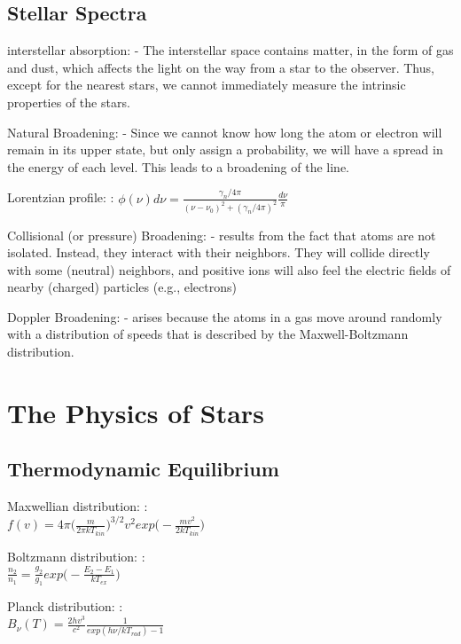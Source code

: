 \documentclass[a4paper, 11pt, landscape]{article}
\begin{document}
\begin{multicols*}{3}
\subsection{Stellar Spectra}
\begin{compactenum}
    \item [\color{red}interstellar absorption:]  - The interstellar space contains matter, in the form of gas and dust, which affects the light on the way from a star to the observer. Thus, except for the nearest stars, we cannot immediately measure the intrinsic properties of the stars.
	\item [\color{red}Natural Broadening:] - Since we cannot know how long the atom or electron will remain in its upper state, but only assign a probability, we will have a spread in the energy of each level. This leads to a broadening of the line.
	\item [\color{red}Lorentzian profile:] : $\phi(\nu) d\nu = \frac{\gamma_{n}/4\pi}{(\nu - \nu_{0})^{2} + (\gamma_{n}/4\pi)^{2}}\frac{d\nu}{\pi}$
	\item [\color{red}Collisional (or pressure) Broadening:]  - results from the fact that atoms are not isolated. Instead, they interact with their neighbors. They will collide directly with some (neutral) neighbors, and positive ions will also feel the electric fields of nearby (charged) particles (e.g., electrons)
	\item [\color{red}Doppler Broadening:]  - arises because the atoms in a gas move around randomly with a distribution of speeds that is described by the Maxwell-Boltzmann distribution.
\end{compactenum}

\section{The Physics of Stars}
\subsection{Thermodynamic Equilibrium}
\begin{compactenum}
	\item [\color{red}Maxwellian distribution:]:\\ 
	$f(v) = 4\pi \Big(\frac{m}{2\pi k T_{kin}}\Big)^{3/2}v^{2} exp\Big(-\frac{mv^{2}}{2kT_{kin}}\Big)$
	\item [\color{red}Boltzmann distribution:]: \\
	$\frac{n_2}{n_1} = \frac{g_2}{g_1}exp\Big(-\frac{E_{2} - E_{1}}{k T_{ex}}\Big)$
	\item [\color{red}Planck distribution:]: \\
	$B_{\nu}(T) = \frac{2hv^{3}}{c^{2}} \frac{1}{exp(h\nu / kT_{rad}) - 1}$
\end{compactenum}


\end{multicols*}
\end{document}

